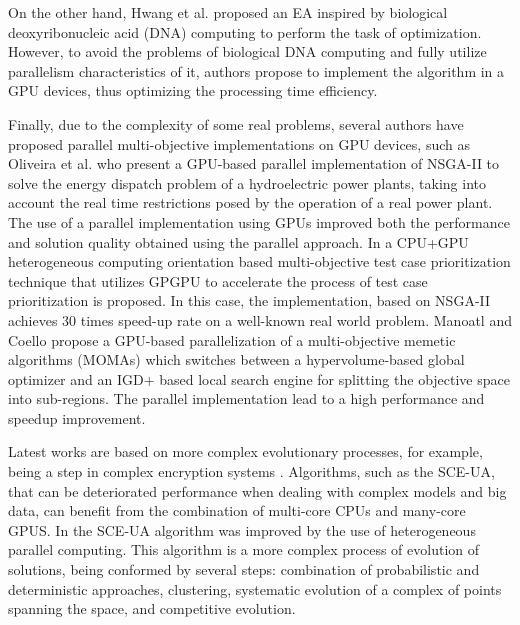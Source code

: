 \documentclass{article}
\begin{document}
On the other hand, Hwang et al. \cite{Hwang7470556} proposed an EA inspired by biological deoxyribonucleic acid (DNA) computing  to perform the task of optimization. However, to avoid the problems of biological DNA computing and fully utilize parallelism characteristics of it, authors propose to implement the algorithm in a GPU devices, thus optimizing the processing time efficiency.

Finally, due to the complexity of some real problems, several authors have proposed parallel multi-objective implementations on GPU devices, such as Oliveira et al. \cite{Oliveira7744337} who present a GPU-based parallel implementation of NSGA-II to solve the energy dispatch problem of a hydroelectric power plants, taking into account the real time restrictions posed by the operation of a real power plant. The use of a parallel implementation using GPUs improved both the performance and solution quality obtained using the parallel approach.
In \cite{Bian2016} a CPU+GPU heterogeneous computing orientation based multi-objective test case prioritization technique that utilizes GPGPU to accelerate the process of test case prioritization is proposed. In this case, the implementation, based on NSGA-II achieves 30 times speed-up rate on a well-known real world problem.
Manoatl and Coello \cite{ManoatlLopez2016} propose a GPU-based
parallelization of a multi-objective memetic algorithms (MOMAs) which
switches between a hypervolume-based global optimizer and an IGD+
based local search engine for splitting the objective space into
sub-regions. The parallel implementation lead to a high performance
and speedup improvement.

Latest works are based on more complex evolutionary processes, for example, being a step in complex encryption systems \cite{Aljawarneh18Encryption}. Algorithms, such as the SCE-UA, that can be deteriorated performance when dealing with complex models and big data, can benefit from the combination of multi-core CPUs and many-core GPUS. In \cite{Kan17SCEUA} the SCE-UA algorithm was improved by the use of heterogeneous parallel computing. This algorithm is a more complex process of evolution of solutions, being conformed by several steps: combination of probabilistic and deterministic  approaches, clustering, systematic evolution of a complex of points spanning the space, and competitive evolution.


\end{document}
